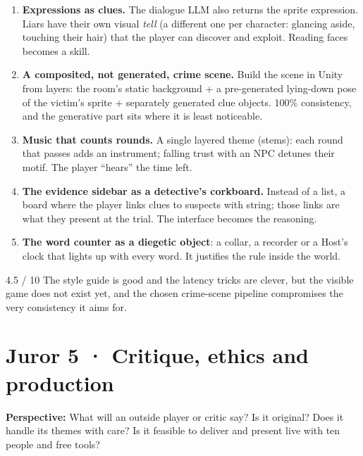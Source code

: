 \documentclass[11pt,a4paper]{article}
\begin{document}
\begin{inedito}
\begin{enumerate}
\item \textbf{Expressions as clues.} The dialogue LLM also returns the sprite expression. Liars have
their own visual \emph{tell} (a different one per character: glancing aside, touching their hair)
that the player can discover and exploit. Reading faces becomes a skill.
\item \textbf{A composited, not generated, crime scene.} Build the scene in Unity from layers: the
room's static background + a pre-generated lying-down pose of the victim's sprite + separately
generated clue objects. 100\% consistency, and the generative part sits where it is least noticeable.
\item \textbf{Music that counts rounds.} A single layered theme (stems): each round that passes adds an
instrument; falling trust with an NPC detunes their motif. The player ``hears'' the time left.
\item \textbf{The evidence sidebar as a detective's corkboard.} Instead of a list, a board where the
player links clues to suspects with string; those links are what they present at the trial. The
interface becomes the reasoning.
\item \textbf{The word counter as a diegetic object}: a collar, a recorder or a Host's clock that
lights up with every word. It justifies the rule inside the world.
\end{enumerate}
\end{inedito}

\begin{veredicto}{4.5 / 10}
The style guide is good and the latency tricks are clever, but the visible game does not exist yet,
and the chosen crime-scene pipeline compromises the very consistency it aims for.
\end{veredicto}

\section{Juror 5 · Critique, ethics and production}

\begin{perfil}
\textbf{Perspective:} What will an outside player or critic say? Is it original? Does it handle its
themes with care? Is it feasible to deliver and present live with ten people and free tools?
\end{perfil}
\end{document}
